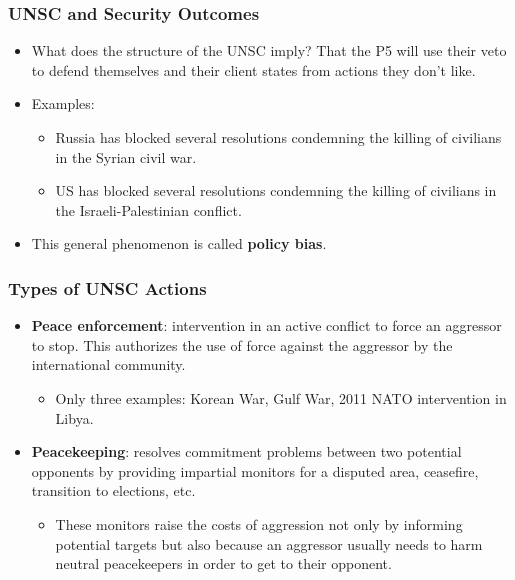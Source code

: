\documentclass[handout]{beamer}
\begin{document}
\begin{frame} 
	\frametitle{\LARGE{UNSC and Security Outcomes}}
	\begin{itemize}
		\item What does the structure of the UNSC imply? \pause That the P5 will use their veto to defend themselves and their client states from actions they don't like. \pause
		\item Examples:
		\begin{itemize}
			\item Russia has blocked several resolutions condemning the killing of civilians in the Syrian civil war. \pause
			\item US has blocked several resolutions condemning the killing of civilians in the Israeli-Palestinian conflict. \pause
		\end{itemize}
	\item This general phenomenon is called \textbf{policy bias}. 
	\end{itemize}
\end{frame}

\begin{frame} 
	\frametitle{\LARGE{Types of UNSC Actions}}
	\begin{itemize}
		\item \textbf{Peace enforcement}: intervention in an active conflict to force an aggressor to stop. This authorizes the use of force against the aggressor by the international community. \pause
		\begin{itemize}
			\item Only three examples: Korean War, Gulf War, 2011 NATO intervention in Libya. \pause
		\end{itemize}
		\item \textbf{Peacekeeping}: resolves commitment problems between two potential opponents by providing impartial monitors for a disputed area, ceasefire, transition to elections, etc. \pause
		\begin{itemize}
			\item These monitors raise the costs of aggression not only by informing potential targets but also because an aggressor usually needs to harm neutral peacekeepers in order to get to their opponent. \pause
		\end{itemize}
	\end{itemize}
\end{frame}
\end{document}
